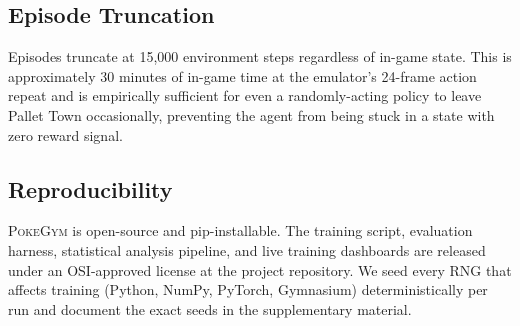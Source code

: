 \subsection{Episode Truncation}
Episodes truncate at 15{,}000 environment steps regardless of in-game
state.  This is approximately 30 minutes of in-game time at the
emulator's 24-frame action repeat and is empirically sufficient for
even a randomly-acting policy to leave Pallet Town occasionally,
preventing the agent from being stuck in a state with zero reward
signal.

\subsection{Reproducibility}
\textsc{PokeGym} is open-source and pip-installable.  The training
script, evaluation harness, statistical analysis pipeline, and live
training dashboards are released under an OSI-approved license at the
project repository.  We seed every RNG that affects training (Python,
NumPy, PyTorch, Gymnasium) deterministically per run and document the
exact seeds in the supplementary material.
